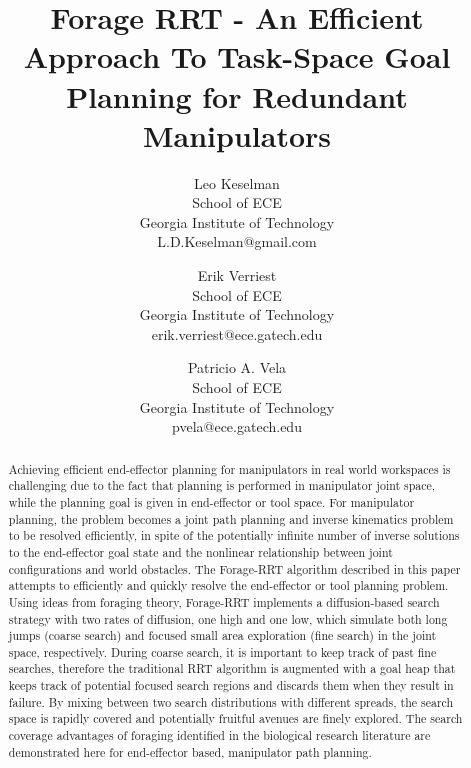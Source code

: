 \documentclass[conference]{IEEEtran}
\begin{document}
\title{Forage RRT - An Efficient Approach To Task-Space Goal Planning for 
  Redundant Manipulators}
\author{%
  Leo Keselman\\ School of ECE\\ Georgia Institute of Technology\\
    L.D.Keselman@gmail.com \and
  Erik Verriest \\ School of ECE\\ Georgia Institute of Technology\\
    erik.verriest@ece.gatech.edu \and
  Patricio A. Vela\\ School of ECE\\ Georgia Institute of Technology\\
    pvela@ece.gatech.edu 
}
\maketitle

\newcommand{\CITE}{{\bf [CITE]}}

\begin{abstract}
Achieving efficient end-effector planning for manipulators in real world
workspaces is challenging due to the fact that planning is performed in
manipulator joint space, while the planning goal is given in end-effector or
tool space.  
For manipulator planning, the problem becomes a joint path
planning and inverse kinematics problem to be resolved efficiently, in spite
of the potentially infinite number of inverse solutions to the end-effector
goal state and the nonlinear relationship between joint configurations and
world obstacles.  The Forage-RRT algorithm described in this paper attempts
to efficiently and quickly resolve the end-effector or tool planning
problem.  Using ideas from foraging theory, Forage-RRT implements a
diffusion-based search strategy with two rates of diffusion, one high and
one low, which simulate both long jumps (coarse search) and focused small
area exploration (fine search) in the joint space, respectively.  During
coarse search, it is important to keep track of past fine searches,
therefore the traditional RRT algorithm is augmented with a goal heap that
keeps track of potential focused search regions and discards them when
they result in failure.  By mixing between two search distributions with
different spreads, the search space is rapidly covered and potentially
fruitful avenues are finely explored.  The search coverage advantages of
foraging identified in the biological research literature are demonstrated
here for end-effector based, manipulator path planning.  
\end{abstract}
\end{document}
